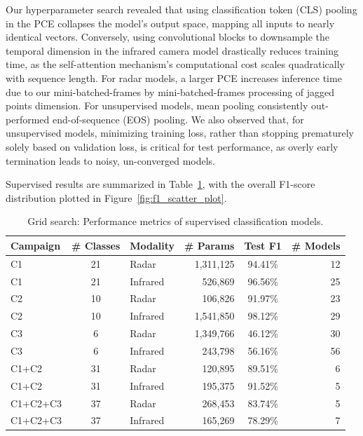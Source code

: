 \documentclass{article}
\begin{document}
Our hyperparameter search revealed that using classification token (CLS) pooling in the PCE collapses the model's output space, mapping all inputs to nearly identical vectors. Conversely, using convolutional blocks to downsample the temporal dimension in the infrared camera model drastically reduces training time, as the self-attention mechanism's computational cost scales quadratically with sequence length. For radar models, a larger PCE increases inference time due to our mini-batched-frames by mini-batched-frames processing of jagged points dimension. For unsupervised models, mean pooling consistently out-performed end-of-sequence (EOS) pooling. We also observed that, for unsupervised models, minimizing training loss, rather than stopping prematurely solely based on validation loss, is critical for test performance, as overly early termination leads to noisy, un-converged models.

Supervised results are summarized in Table~\ref{tab:supervised_results}, with the overall F1-score distribution plotted in Figure~\ref{fig:f1_scatter_plot}.

\begin{table}[!t]
\centering
\small
\setlength{\tabcolsep}{3pt}
\begin{tabular}{l c l r c r}
\toprule
\textbf{Campaign} & \textbf{\# Classes} & \textbf{Modality} & \textbf{\# Params} & \textbf{Test F1} & \textbf{\# Models} \\
\midrule
C1       & 21 & Radar    & 1,311,125 & 94.41\% & 12 \\
C1       & 21 & Infrared &   526,869 & 96.56\% & 25 \\
C2       & 10 & Radar    &   106,826 & 91.97\% & 23 \\
C2       & 10 & Infrared & 1,541,850 & 98.12\% & 29 \\
C3       &  6 & Radar    & 1,349,766 & 46.12\% & 30 \\
C3       &  6 & Infrared &   243,798 & 56.16\% & 56 \\
\hline
C1+C2    & 31 & Radar    &   120,895 & 89.51\% &  6 \\
C1+C2    & 31 & Infrared &   195,375 & 91.52\% &  5 \\
C1+C2+C3 & 37 & Radar    &   268,453 & 83.74\% &  5 \\
C1+C2+C3 & 37 & Infrared &   165,269 & 78.29\% &  7 \\
\bottomrule
\end{tabular}
\caption{Grid search: Performance metrics of supervised classification models.}
\label{tab:supervised_results}
\end{table}
\end{document}
